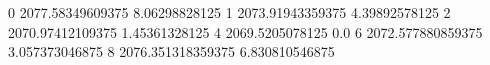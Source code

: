0 2077.58349609375 8.06298828125
1 2073.91943359375 4.39892578125
2 2070.97412109375 1.45361328125
4 2069.5205078125 0.0
6 2072.577880859375 3.057373046875
8 2076.351318359375 6.830810546875
